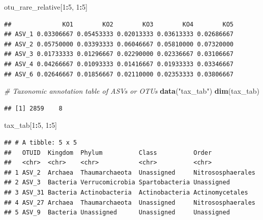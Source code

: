 \documentclass[
]{book}
\newenvironment{Shaded}{\begin{snugshade}}{\end{snugshade}}
\newcommand{\CommentTok}[1]{\textcolor[rgb]{0.56,0.35,0.01}{\textit{#1}}}
\newcommand{\DecValTok}[1]{\textcolor[rgb]{0.00,0.00,0.81}{#1}}
\newcommand{\FunctionTok}[1]{\textcolor[rgb]{0.13,0.29,0.53}{\textbf{#1}}}
\newcommand{\NormalTok}[1]{#1}
\newcommand{\SpecialCharTok}[1]{\textcolor[rgb]{0.81,0.36,0.00}{\textbf{#1}}}
\newcommand{\StringTok}[1]{\textcolor[rgb]{0.31,0.60,0.02}{#1}}
\begin{document}
\begin{Shaded}
\begin{Highlighting}[]
\NormalTok{otu\_rare\_relative[}\DecValTok{1}\SpecialCharTok{:}\DecValTok{5}\NormalTok{, }\DecValTok{1}\SpecialCharTok{:}\DecValTok{5}\NormalTok{]}
\end{Highlighting}
\end{Shaded}

\begin{verbatim}
##              KO1        KO2        KO3        KO4        KO5
## ASV_1 0.03306667 0.05453333 0.02013333 0.03613333 0.02686667
## ASV_2 0.05750000 0.03393333 0.06046667 0.05810000 0.07320000
## ASV_3 0.01733333 0.01296667 0.02290000 0.02336667 0.03106667
## ASV_4 0.04266667 0.01093333 0.01416667 0.01933333 0.03346667
## ASV_6 0.02646667 0.01856667 0.02110000 0.02353333 0.03806667
\end{verbatim}

\begin{Shaded}
\begin{Highlighting}[]
\CommentTok{\# Taxonomic annotation table of ASVs or OTUs}
\FunctionTok{data}\NormalTok{(}\StringTok{"tax\_tab"}\NormalTok{)}
\FunctionTok{dim}\NormalTok{(tax\_tab)}
\end{Highlighting}
\end{Shaded}

\begin{verbatim}
## [1] 2859    8
\end{verbatim}

\begin{Shaded}
\begin{Highlighting}[]
\NormalTok{tax\_tab[}\DecValTok{1}\SpecialCharTok{:}\DecValTok{5}\NormalTok{, }\DecValTok{1}\SpecialCharTok{:}\DecValTok{5}\NormalTok{]}
\end{Highlighting}
\end{Shaded}

\begin{verbatim}
## # A tibble: 5 x 5
##   OTUID  Kingdom  Phylum          Class          Order            
##   <chr>  <chr>    <chr>           <chr>          <chr>            
## 1 ASV_2  Archaea  Thaumarchaeota  Unassigned     Nitrososphaerales
## 2 ASV_3  Bacteria Verrucomicrobia Spartobacteria Unassigned       
## 3 ASV_31 Bacteria Actinobacteria  Actinobacteria Actinomycetales  
## 4 ASV_27 Archaea  Thaumarchaeota  Unassigned     Nitrososphaerales
## 5 ASV_9  Bacteria Unassigned      Unassigned     Unassigned
\end{verbatim}
\end{document}
